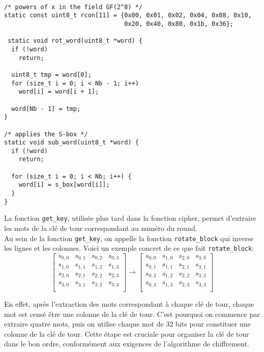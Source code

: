 \documentclass[a4paper, 10pt]{article}
\begin{document}
\small{
\begin{verbatim}

/* powers of x in the field GF(2^8) */
static const uint8_t rcon[11] = {0x00, 0x01, 0x02, 0x04, 0x08, 0x10,
                                 0x20, 0x40, 0x80, 0x1b, 0x36};

 static void rot_word(uint8_t *word) {
  if (!word)
    return;

  uint8_t tmp = word[0];
  for (size_t i = 0; i < Nb - 1; i++)
    word[i] = word[i + 1];

  word[Nb - 1] = tmp;
}

/* applies the S-box */
static void sub_word(uint8_t *word) {
  if (!word)
    return;

  for (size_t i = 0; i < Nb; i++) {
    word[i] = s_box[word[i]];
  }
}
\end{verbatim}
}
\normalsize
La fonction \texttt{get\_key}, utilisée plus tard dans la fonction cipher, permet d'extraire les mots de la clé de tour correspondant au numéro du round.\\
Au sein de la fonction  \texttt{get\_key}, on appelle la fonction \texttt{rotate\_block} qui inverse les lignes et les colonnes.
Voici un exemple concret de ce que fait \texttt{rotate\_block}:
\[
  \begin{bmatrix}
    s_{0,0}&s_{0,1}& s_{0,2}&s_{0,3}\\
    s_{1,0}&s_{1,1}& s_{1,2}&s_{1,3}\\
    s_{2,0}&s_{2,1}& s_{2,2}&s_{2,3}\\
    s_{3,0}&s_{3,1}& s_{3,2}&s_{3,3}\\
  \end{bmatrix}
  \rightarrow
  \begin{bmatrix}
    s_{0,0}&s_{1,0}& s_{2,0}&s_{3,0}\\
    s_{0,1}&s_{1,1}& s_{2,1}&s_{3,1}\\
    s_{0,2}&s_{1,2}& s_{2,2}&s_{3,2}\\
    s_{0,3}&s_{1,3}& s_{2,3}&s_{3,3}\\
  \end{bmatrix}
\]

En effet, après l'extraction des mots correspondant à chaque clé de tour, 
chaque mot est censé être une colonne de la clé de tour. C'est pourquoi on 
commence par extraire quatre mots, puis on utilise chaque mot de 32 bits pour constituer une colonne de la clé de tour.
Cette étape est cruciale pour organiser la clé de tour dans le bon ordre, conformément aux exigences de 
l'algorithme de chiffrement.
\end{document}
